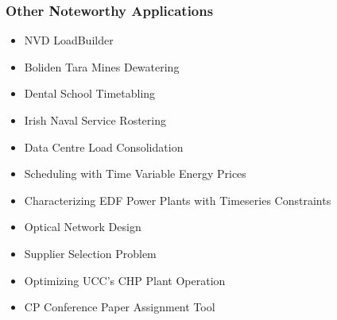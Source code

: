 \begin{frame}
\frametitle{Other Noteworthy Applications}
\begin{itemize}
\item NVD LoadBuilder
\item Boliden Tara Mines Dewatering
\item Dental School Timetabling
\item Irish Naval Service Rostering
\item Data Centre Load Consolidation
\item Scheduling with Time Variable Energy Prices
\item Characterizing EDF Power Plants with Timeseries Constraints
\item Optical Network Design
\item Supplier Selection Problem
\item Optimizing UCC's CHP Plant Operation
\item CP Conference Paper Assignment Tool
\end{itemize}
\end{frame}

